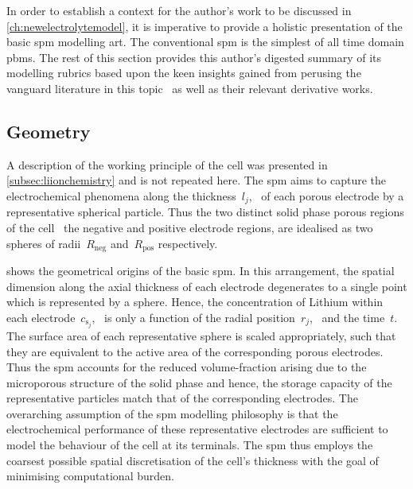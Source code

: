 
In  order  to  establish  a  context  for the  author's  work  to  be  discussed
in  \cref{ch:newelectrolytemodel},  it  is  imperative  to  provide  a  holistic
presentation of the basic \gls{spm} modelling art. The conventional \gls{spm} is
the  simplest  of  all  time  domain  \glspl{pbm}.  The  rest  of  this  section
provides  this author's  digested summary  of its  modelling rubrics  based upon
the  keen  insights  gained  from  perusing  the  vanguard  literature  in  this
topic~\cite{Santhanagopalan2006,Santhanagopalan2006a,DiDomenico2010} as  well as
their relevant derivative works.

\subsection{Geometry}\label{subsec:basicspmgeometry}

A  description  of   the  working  principle  of  the  cell   was  presented  in
\cref{subsec:liionchemistry} and  is not  repeated here.  The \gls{spm}  aims to
capture the electrochemical phenomena along the thickness~$l_j$,~\jinnegpos{} of
each  porous electrode  by a  representative  spherical particle.  Thus the  two
distinct  solid  phase porous  regions  of  the  cell \ie~the  negative  and
positive electrode regions, are idealised as two spheres of radii~$R_\text{neg}$
and~$R_\text{pos}$ respectively.


   shows   the   geometrical  origins   of   the   basic
\gls{spm}.  In  this   arrangement,  the  spatial  dimension   along  the  axial
thickness  of   each  electrode   degenerates  to  a   single  point   which  is
represented  by  a sphere.  Hence,  the  concentration  of Lithium  within  each
electrode~$c_{\text{s}_j}$,~\jinnegpos{}  is  only  a  function  of  the  radial
position~$r_j$,~\jinnegpos{}  and  the  time~$t$.   The  surface  area  of  each
representative sphere is scaled appropriately,  such that they are equivalent to
the  active area  of the  corresponding  porous electrodes.  Thus the  \gls{spm}
accounts  for  the  reduced  volume-fraction  arising  due  to  the  microporous
structure  of  the   solid  phase  and  hence,  the  storage   capacity  of  the
representative  particles  match  that  of  the  corresponding  electrodes.  The
overarching  assumption  of  the  \gls{spm} modelling  philosophy  is  that  the
electrochemical performance of these representative electrodes are sufficient to
model the behaviour of the cell at its terminals. The \gls{spm} thus employs the
coarsest possible spatial  discretisation of the cell's thickness  with the goal
of minimising computational burden.

